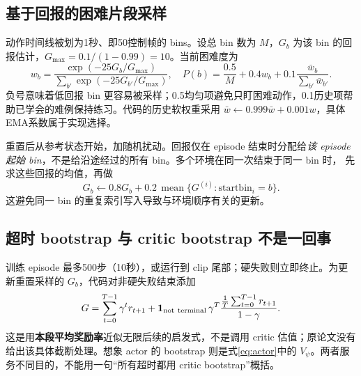\subsection{基于回报的困难片段采样}
动作时间线被划为1秒、即50控制帧的 bins。设总 bin 数为 $M$，$G_b$ 为该 bin 的回报估计，$G_{\max}=0.1/(1-0.99)=10$。当前困难度为
\begin{equation}
 w_b=\frac{\exp(-25G_b/G_{\max})}{\sum_{b'}\exp(-25G_{b'}/G_{\max})},\quad
 P(b)=\frac{0.5}{M}+0.4w_b+0.1\frac{\bar w_b}{\sum_{b'}\bar w_{b'}}.
\end{equation}
负号意味着低回报 bin 更容易被采样；0.5均匀项避免只盯困难动作，0.1历史项帮助已学会的难例保持练习。代码的历史软权重采用 $\bar w\leftarrow0.999\bar w+0.001w$，具体EMA系数属于实现选择。

重置后从参考状态开始，加随机扰动。回报仅在 episode 结束时分配给\emph{该 episode 起始 bin}，不是给沿途经过的所有 bin。多个环境在同一次结束于同一 bin 时， 先求这些回报的均值，再做
\begin{equation}
 G_b\leftarrow0.8G_b+0.2\,\operatorname{mean}\{G^{(i)}:\mathrm{startbin}_i=b\}.
\end{equation}
这避免同一 bin 的重复索引写入导致与环境顺序有关的更新。

\subsection{超时 bootstrap 与 critic bootstrap 不是一回事}
训练 episode 最多500步（10秒），或运行到 clip 尾部；硬失败则立即终止。为更新重置采样的 $G_b$，代码对非硬失败结束添加
\begin{equation}
 G=\sum_{t=0}^{T-1}\gamma^t r_{t+1}
 +\mathbf1_{\rm not\ terminal}\,\gamma^T
 \frac{\frac1T\sum_{t=0}^{T-1}r_{t+1}}{1-\gamma}.
\end{equation}
这是用\textbf{本段平均奖励率}近似无限后续的启发式，不是调用 critic 估值；原论文没有给出该具体截断处理。想象 actor 的 bootstrap 则是式\eqref{eq:actor}中的 $V_\psi$。两者服务不同目的，不能用一句“所有超时都用 critic bootstrap”概括。
